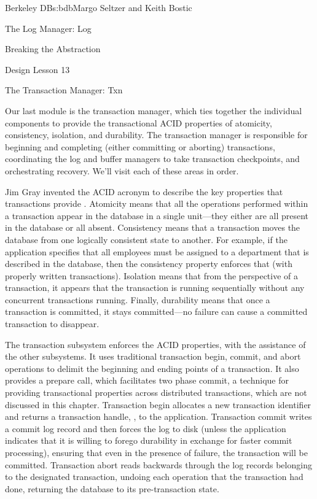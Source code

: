 \begin{aosachapter}{Berkeley DB}{s:bdb}{Margo Seltzer and Keith Bostic}
\begin{aosasect1}{The Log Manager: Log}
\begin{aosasect2}{Breaking the Abstraction}
\begin{aosabox}{Design Lesson 13}
\end{aosabox}

\end{aosasect2}

\end{aosasect1}

\begin{aosasect1}{The Transaction Manager: Txn}

Our last module is the transaction manager, which ties together the
individual components to provide the transactional ACID properties of
atomicity, consistency, isolation, and durability. The transaction
manager is responsible for beginning and completing (either committing
or aborting) transactions, coordinating the log and buffer managers to
take transaction checkpoints, and orchestrating recovery. We'll visit
each of these areas in order.


Jim Gray invented the ACID acronym to
describe the key properties that transactions provide \cite{bib:gray:trans}.  Atomicity
means that all the operations performed within a transaction appear in
the database in a single unit---they either are all present in the
database or all absent. Consistency means that a transaction moves the
database from one logically consistent state to another. For example,
if the application specifies that all employees must be assigned to a
department that is described in the database, then the consistency
property enforces that (with properly written transactions). Isolation
means that from the perspective of a transaction, it appears that the
transaction is running sequentially without any concurrent
transactions running. Finally, durability means that once a
transaction is committed, it stays committed---no failure can cause a
committed transaction to disappear.

The transaction subsystem enforces the ACID properties, with the
assistance of the other subsystems. It uses traditional transaction
begin, commit, and abort operations to delimit the beginning and
ending points of a transaction. It also provides a prepare call, which
facilitates two phase commit, a technique for providing transactional
properties across distributed transactions, which are not discussed in
this chapter. Transaction begin allocates a new transaction identifier
and returns a transaction handle, , to the application.
Transaction commit writes a commit log record and then forces the log
to disk (unless the application indicates that it is willing to forego
durability in exchange for faster commit processing), ensuring that
even in the presence of failure, the transaction will be
committed. Transaction abort reads backwards through the log records
belonging to the designated transaction, undoing each operation that
the transaction had done, returning the database to its
pre-transaction state.


\end{aosasect1}
\end{aosachapter}
